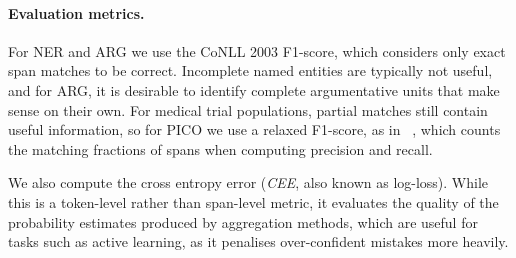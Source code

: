 \paragraph{Evaluation metrics. }
For NER and ARG we use the CoNLL 2003 F1-score, which considers only exact span matches %
to be correct. Incomplete named entities are typically not useful, and for ARG, it is desirable to identify complete argumentative units that
make sense on their own. 
For medical trial populations, partial matches still contain useful information, so for PICO we use a relaxed F1-score, as in ~\citet{nguyen2017aggregating}, 
which counts the matching fractions of spans when computing precision and recall. 
 
We also compute the cross entropy error (\emph{CEE}, also known as log-loss).
While this is a token-level rather than span-level metric, it evaluates the quality of the probability estimates produced by aggregation methods, which are useful for tasks such as active learning, as it penalises over-confident mistakes more heavily.

